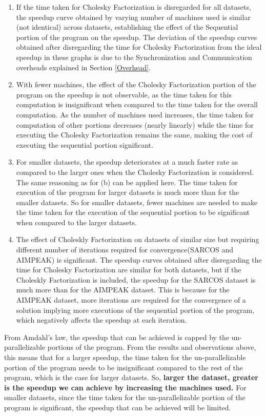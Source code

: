 \documentclass[12pt]{article}
\begin{document}
\begin{enumerate}[label=(\alph*)]
\item If the time taken for Cholesky Factorization is disregarded for all datasets, the speedup curve obtained by varying number of machines used is similar (not identical) across datasets, establishing the effect of the Sequential portion of the program on the speedup. The deviation of the speedup curves obtained after disregarding the time for Cholesky Factorization from the ideal speedup in these graphs is due to the Synchronization and Communication overheads explained in Section \ref{Overhead}.
\item With fewer machines, the effect of the Cholesky Factorization portion of the program on the speedup is not observable, as the time taken for this computation is insignificant when compared to the time taken for the overall computation. As the number of machines used increases, the time taken for computation of other portions decreases (nearly linearly) while the time for executing the Cholesky Factorization remains the same, making the cost of executing the sequential portion significant.
\item For smaller datasets, the speedup deteriorates at a much faster rate as compared to the larger ones when the Cholesky Factorization is considered. The same reasoning as for (b) can be applied here. The time taken for execution of the program for larger datasets is much more than for the smaller datasets. So for smaller datasets, fewer machines are needed to make the time taken for the execution of the sequential portion to be significant when compared to the larger datasets.
\item The effect of Choleskly Factorization on datasets of similar size but requiring different number of iterations required for convergence(SARCOS and AIMPEAK) is significant. The speedup curves obtained after disregarding the time for Cholesky Factorization are similar for both datasets, but if the Choleskly Factorization is included, the speedup for the SARCOS dataset is much more than for the AIMPEAK dataset. This is because for the AIMPEAK dataset, more iterations are required for the convergence of a solution implying more executions of the sequential portion of the program, which negatively affects the speedup at each iteration.
\end{enumerate}
From Amdahl's law, the speedup that can be achieved is capped by the un-parallelizable portions of the program. From the results and observations above, this means that for a larger speedup, the time taken for the un-parallelizable portion of the program needs to be insignificant compared to the rest of the program, which is the case for larger datasets. So, {\bf larger the dataset, greater is the speedup we can achieve by increasing the machines used.} For smaller datasets, since the time taken for the un-parallelizable portion of the program is significant, the speedup that can be achieved will be limited.
\end{document}
